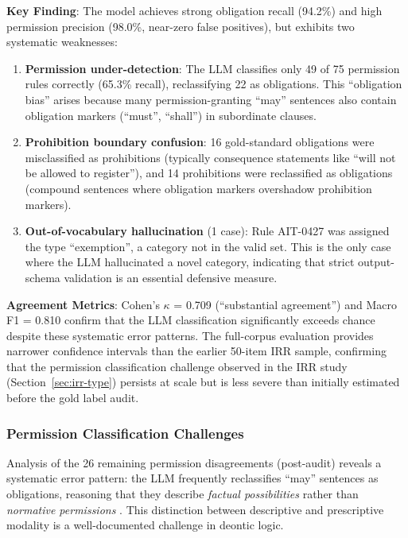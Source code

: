 \textbf{Key Finding}: The model achieves strong obligation recall (94.2\%) and high permission precision (98.0\%, near-zero false positives), but exhibits two systematic weaknesses:
\begin{enumerate}
    \item \textbf{Permission under-detection}: The LLM classifies only 49 of 75 permission rules correctly (65.3\% recall), reclassifying 22 as obligations. This ``obligation bias'' arises because many permission-granting ``may'' sentences also contain obligation markers (``must'', ``shall'') in subordinate clauses.
    
    \item \textbf{Prohibition boundary confusion}: 16 gold-standard obligations were misclassified as prohibitions (typically consequence statements like ``will not be allowed to register''), and 14 prohibitions were reclassified as obligations (compound sentences where obligation markers overshadow prohibition markers).
    
    \item \textbf{Out-of-vocabulary hallucination} (1 case): Rule AIT-0427 was assigned the type ``exemption'', a category not in the valid set. This is the only case where the LLM hallucinated a novel category, indicating that strict output-schema validation is an essential defensive measure.
\end{enumerate}

\textbf{Agreement Metrics}: Cohen's $\kappa$ = 0.709 (``substantial agreement'') and Macro F1 = 0.810 confirm that the LLM classification significantly exceeds chance despite these systematic error patterns. The full-corpus evaluation provides narrower confidence intervals than the earlier 50-item IRR sample, confirming that the permission classification challenge observed in the IRR study (Section~\ref{sec:irr-type}) persists at scale but is less severe than initially estimated before the gold label audit.

\subsubsection{Permission Classification Challenges}

Analysis of the 26 remaining permission disagreements (post-audit) reveals a systematic error pattern: the LLM frequently reclassifies ``may'' sentences as obligations, reasoning that they describe \textit{factual possibilities} rather than \textit{normative permissions} \citep{kratzer2012modals}. This distinction between descriptive and prescriptive modality is a well-documented challenge in deontic logic.

